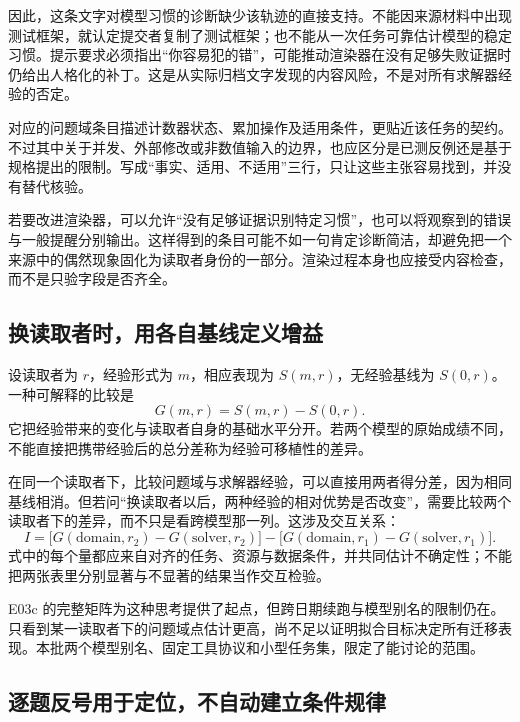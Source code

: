 因此，这条文字对模型习惯的诊断缺少该轨迹的直接支持。不能因来源材料中出现测试框架，就认定提交者复制了测试框架；也不能从一次任务可靠估计模型的稳定习惯。提示要求必须指出“你容易犯的错”，可能推动渲染器在没有足够失败证据时仍给出人格化的补丁。这是从实际归档文字发现的内容风险，不是对所有求解器经验的否定。

对应的问题域条目描述计数器状态、累加操作及适用条件，更贴近该任务的契约。不过其中关于并发、外部修改或非数值输入的边界，也应区分是已测反例还是基于规格提出的限制。写成“事实、适用、不适用”三行，只让这些主张容易找到，并没有替代核验。

若要改进渲染器，可以允许“没有足够证据识别特定习惯”，也可以将观察到的错误与一般提醒分别输出。这样得到的条目可能不如一句肯定诊断简洁，却避免把一个来源中的偶然现象固化为读取者身份的一部分。渲染过程本身也应接受内容检查，而不是只验字段是否齐全。

\subsection{换读取者时，用各自基线定义增益}

设读取者为 $r$，经验形式为 $m$，相应表现为 $S(m,r)$，无经验基线为 $S(0,r)$。一种可解释的比较是
\begin{equation}
G(m,r)=S(m,r)-S(0,r).
\label{eq:ch05-reader-gain}
\end{equation}
它把经验带来的变化与读取者自身的基础水平分开。若两个模型的原始成绩不同，不能直接把携带经验后的总分差称为经验可移植性的差异。

在同一个读取者下，比较问题域与求解器经验，可以直接用两者得分差，因为相同基线相消。但若问“换读取者以后，两种经验的相对优势是否改变”，需要比较两个读取者下的差异，而不只是看跨模型那一列。这涉及交互关系：
\begin{equation}
I=\bigl[G(\mathrm{domain},r_2)-G(\mathrm{solver},r_2)\bigr]
 -\bigl[G(\mathrm{domain},r_1)-G(\mathrm{solver},r_1)\bigr].
\label{eq:ch05-reader-interaction}
\end{equation}
式中的每个量都应来自对齐的任务、资源与数据条件，并共同估计不确定性；不能把两张表里分别显著与不显著的结果当作交互检验。

E03c 的完整矩阵为这种思考提供了起点，但跨日期续跑与模型别名的限制仍在。只看到某一读取者下的问题域点估计更高，尚不足以证明拟合目标决定所有迁移表现。本批两个模型别名、固定工具协议和小型任务集，限定了能讨论的范围。

\subsection{逐题反号用于定位，不自动建立条件规律}


